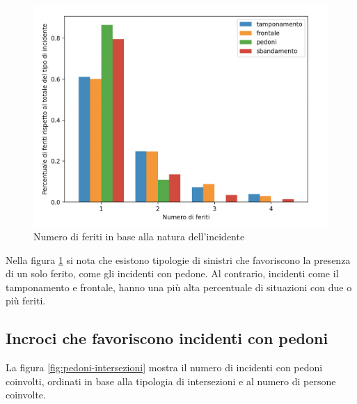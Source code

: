 \documentclass[a4paper]{report}
\begin{document}
\begin{figure}
    \includegraphics[width=\linewidth]{../src/incidenti/incidenti_senza_coords/natura_incidente/numero_feriti.png}
    \caption{Numero di feriti in base alla natura dell'incidente}
    \label{fig:numero-feriti}
\end{figure}

Nella figura \ref{fig:numero-feriti} si nota che esistono tipologie di sinistri che 
favoriscono la presenza di un solo ferito, come gli incidenti con pedone. 
Al contrario, incidenti come il tamponamento e frontale, 
hanno una più alta percentuale di situazioni con due o più feriti.

\subsection{Incroci che favoriscono incidenti con pedoni}

La figura \ref{fig:pedoni-intersezioni} mostra il numero di incidenti con pedoni coinvolti, 
ordinati in base alla tipologia di intersezioni e al numero di persone coinvolte.
\end{document}
